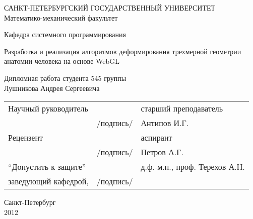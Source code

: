 \thispagestyle{empty}
\begin{center}
САНКТ-ПЕТЕРБУРГСКИЙ ГОСУДАРСТВЕННЫЙ УНИВЕРСИТЕТ\\
Математико-механический факультет\\
\end{center}
\begin{center}
Кафедра системного программирования\\
\end{center}
\vspace{2cm}
\begin{center}
    \Large{Разработка и реализация алгоритмов деформирования трехмерной геометрии
 анатомии человека на основе WebGL} \\
\end{center}
\vspace{1cm}
\begin{center}
    \normalsize{Дипломная работа студента 545 группы} \\
    \large{Лушникова Андрея Сергеевича}
\end{center}
\vspace{3cm}
\noindent
\begin{center}
    \small
    \begin{tabular}{lcl}
        Научный руководитель & \dotuline{\phantom{кошерная подпись}} & старший преподаватель\\
        & /подпись/ & Антипов И.Г.\\
        Рецензент & \dotuline{\phantom{кошерная подпись}} & аспирант \\
        & /подпись/& Петров А.Г. \\
        ``Допустить к защите'' & \dotuline{\phantom{кошерная подпись}} & д.ф.-м.н., проф. Терехов А.Н. \\
        заведующий кафедрой, & /подпись/& \\
    \end{tabular}
\end{center}
\vspace{\fill}
\begin{center}
    \small
    Санкт-Петербург\\2012
\end{center}
\pagebreak
